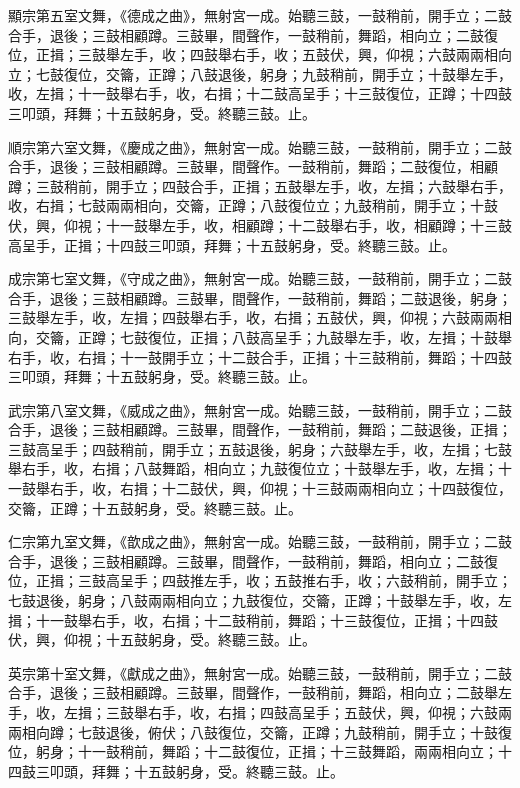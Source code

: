 \begin{pinyinscope}
 顯宗第五室文舞，《德成之曲》，無射宮一成。始聽三鼓，一鼓稍前，開手立；二鼓合手，退後；三鼓相顧蹲。三鼓畢，間聲作，一鼓稍前，舞蹈，相向立；二鼓復位，正揖；三鼓舉左手，收；四鼓舉右手，收；五鼓伏，興，仰視；六鼓兩兩相向立；七鼓復位，交籥，正蹲；八鼓退後，躬身；九鼓稍前，開手立；十鼓舉左手，收，左揖；十一鼓舉右手，收，右揖；十二鼓高呈手；十三鼓復位，正蹲；十四鼓三叩頭，拜舞；十五鼓躬身，受。終聽三鼓。止。



 順宗第六室文舞，《慶成之曲》，無射宮一成。始聽三鼓，一鼓稍前，開手立；二鼓合手，退後；三鼓相顧蹲。三鼓畢，間聲作。一鼓稍前，舞蹈；二鼓復位，相顧蹲；三鼓稍前，開手立；四鼓合手，正揖；五鼓舉左手，收，左揖；六鼓舉右手，收，右揖；七鼓兩兩相向，交籥，正蹲；八鼓復位立；九鼓稍前，開手立；十鼓伏，興，仰視；十一鼓舉左手，收，相顧蹲；十二鼓舉右手，收，相顧蹲；十三鼓高呈手，正揖；十四鼓三叩頭，拜舞；十五鼓躬身，受。終聽三鼓。止。



 成宗第七室文舞，《守成之曲》，無射宮一成。始聽三鼓，一鼓稍前，開手立；二鼓合手，退後；三鼓相顧蹲。三鼓畢，間聲作，一鼓稍前，舞蹈；二鼓退後，躬身；三鼓舉左手，收，左揖；四鼓舉右手，收，右揖；五鼓伏，興，仰視；六鼓兩兩相向，交籥，正蹲；七鼓復位，正揖；八鼓高呈手；九鼓舉左手，收，左揖；十鼓舉右手，收，右揖；十一鼓開手立；十二鼓合手，正揖；十三鼓稍前，舞蹈；十四鼓三叩頭，拜舞；十五鼓躬身，受。終聽三鼓。止。



 武宗第八室文舞，《威成之曲》，無射宮一成。始聽三鼓，一鼓稍前，開手立；二鼓合手，退後；三鼓相顧蹲。三鼓畢，間聲作，一鼓稍前，舞蹈；二鼓退後，正揖；三鼓高呈手；四鼓稍前，開手立；五鼓退後，躬身；六鼓舉左手，收，左揖；七鼓舉右手，收，右揖；八鼓舞蹈，相向立；九鼓復位立；十鼓舉左手，收，左揖；十一鼓舉右手，收，右揖；十二鼓伏，興，仰視；十三鼓兩兩相向立；十四鼓復位，交籥，正蹲；十五鼓躬身，受。終聽三鼓。止。



 仁宗第九室文舞，《歆成之曲》，無射宮一成。始聽三鼓，一鼓稍前，開手立；二鼓合手，退後；三鼓相顧蹲。三鼓畢，間聲作，一鼓稍前，舞蹈，相向立；二鼓復位，正揖；三鼓高呈手；四鼓推左手，收；五鼓推右手，收；六鼓稍前，開手立；七鼓退後，躬身；八鼓兩兩相向立；九鼓復位，交籥，正蹲；十鼓舉左手，收，左揖；十一鼓舉右手，收，右揖；十二鼓稍前，舞蹈；十三鼓復位，正揖；十四鼓伏，興，仰視；十五鼓躬身，受。終聽三鼓。止。



 英宗第十室文舞，《獻成之曲》，無射宮一成。始聽三鼓，一鼓稍前，開手立；二鼓合手，退後；三鼓相顧蹲。三鼓畢，間聲作，一鼓稍前，舞蹈，相向立；二鼓舉左手，收，左揖；三鼓舉右手，收，右揖；四鼓高呈手；五鼓伏，興，仰視；六鼓兩兩相向蹲；七鼓退後，俯伏；八鼓復位，交籥，正蹲；九鼓稍前，開手立；十鼓復位，躬身；十一鼓稍前，舞蹈；十二鼓復位，正揖；十三鼓舞蹈，兩兩相向立；十四鼓三叩頭，拜舞；十五鼓躬身，受。終聽三鼓。止。




\end{pinyinscope}
